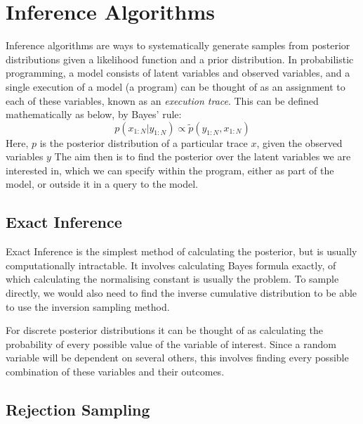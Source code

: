 \section{Inference Algorithms}

Inference algorithms are ways to systematically generate samples from posterior distributions given a likelihood function and a prior distribution. In probabilistic programming, a model consists of latent variables and observed variables, and a single execution of a model (a program) can be thought of as an assignment to each of these variables, known as an \textit{execution trace}. This can be defined mathematically as below, by Bayes' rule:
% 
$$p(x_{1:N}|y_{1:N})\propto \tilde{p}(y_{1:N},x_{1:N})$$ 
% 
Here, $p$ is the posterior distribution of a particular trace $x$, given the observed variables $y$
The aim then is to find the posterior over the latent variables we are interested in, which we can specify within the program, either as part of the model, or outside it in a query to the model.

\subsection{Exact Inference}

Exact Inference is the simplest method of calculating the posterior, but is usually computationally intractable. It involves calculating Bayes formula exactly, of which calculating the normalising constant is usually the problem. To sample directly, we would also need to find the inverse cumulative distribution to be able to use the inversion sampling method.

For discrete posterior distributions it can be thought of as calculating the probability of every possible value of the variable of interest. Since a random variable will be dependent on several others, this involves finding every possible combination of these variables and their outcomes.

\subsection{Rejection Sampling}

